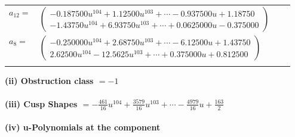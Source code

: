 \documentclass[1p]{elsarticle_modified}
\theoremstyle{definition}
\begin{document}
\begin{tabular}{m{7pt} m{180pt} m{7pt} m{180pt} }
\flushright $a_{12}=$&$\begin{pmatrix}-0.187500 u^{104}+1.12500 u^{103}+\cdots-0.937500 u+1.18750\\-1.43750 u^{104}+6.93750 u^{103}+\cdots+0.0625000 u-0.375000\end{pmatrix}$ \\
\flushright $a_{8}=$&$\begin{pmatrix}-0.250000 u^{104}+2.68750 u^{103}+\cdots-6.12500 u+1.43750\\2.62500 u^{104}-12.5625 u^{103}+\cdots+0.375000 u+0.812500\end{pmatrix}$\\&\end{tabular}
\flushleft \textbf{(ii) Obstruction class $= -1$}\\~\\
\flushleft \textbf{(iii) Cusp Shapes $= -\frac{461}{16} u^{104}+\frac{3579}{16} u^{103}+\cdots-\frac{4979}{16} u+\frac{163}{2}$}\\~\\
\newpage\renewcommand{\arraystretch}{1}
\flushleft \textbf{(iv) u-Polynomials at the component}\newline \\
\end{document}
